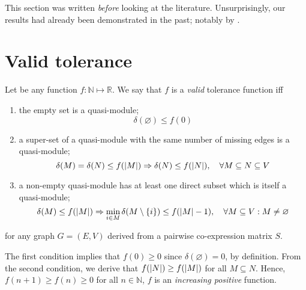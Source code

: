 \documentclass[a4paper, 12pt]{article}
\begin{document}
    \begin{note}
        This section was written \emph{before} looking at the literature. Unsurprisingly, our results had already been demonstrated in the past; notably by \textcite{amin1972upper}.
    \end{note}
    
    \section{Valid tolerance} \label{sec:Valid tolerance}
    
    Let be any function $f: \mathbb{N} \mapsto \mathbb{R}$. We say that $f$ is a \emph{valid} tolerance function iff
    \begin{enumerate}[noitemsep]
        \item the empty set is a quasi-module;
        \begin{equation}
            \delta(\varnothing) \leq f(0)
        \end{equation}
        \item a super-set of a quasi-module with the same number of missing edges is a quasi-module;
        \begin{equation}
            \delta(M) = \delta(N) \leq f(\left|M\right|) \Rightarrow \delta(N) \leq f(\left|N\right|), \quad \forall M \subseteq N \subseteq V
        \end{equation}
        \item a non-empty quasi-module has at least one direct subset which is itself a quasi-module;
        \begin{equation}
            \delta(M) \leq f(\left|M\right|) \Rightarrow \min_{i \in M} \delta(M \setminus \left\{i\right\}) \leq f(\left|M\right| - 1), \quad \forall M \subseteq V: M \neq \varnothing
        \end{equation}
    \end{enumerate}
    for any graph $G = (E, V)$ derived from a pairwise co-expression matrix $S$.
    
    The first condition implies that $f(0) \geq 0$ since $\delta(\varnothing) = 0$, by definition. From the second condition, we derive that $f(\left|N\right|) \geq f(\left|M\right|)$ for all $M \subseteq N$. Hence, $f(n + 1) \geq f(n) \geq 0$ for all $n \in \mathbb{N}$, \ie{} $f$ is an \emph{increasing positive} function.
    
\end{document}

